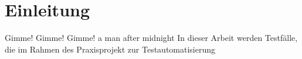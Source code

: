 \chapter{Einleitung}
Gimme! Gimme! Gimme! a man after midnight
In dieser Arbeit werden Testfälle, die im Rahmen des Praxisprojekt zur Testautomatisierung